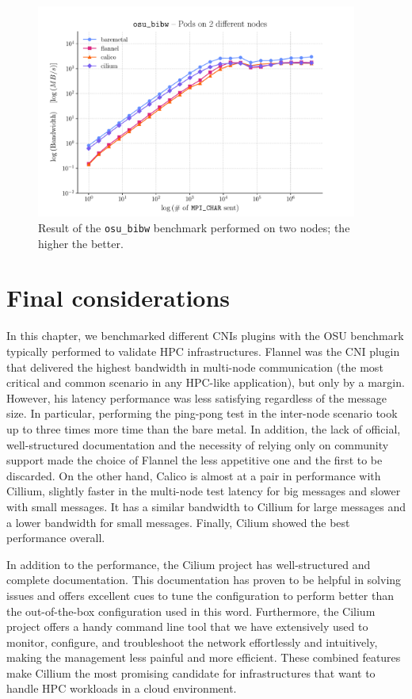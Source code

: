\begin{figure}[H]
  \centering
  \includegraphics[width=0.94\textwidth]{img/chpt3/bibw-2-nodes}
  \caption{Result of the \texttt{osu\_bibw} benchmark performed on two nodes; the
    higher the better.}
  \label{fig:bibw-2-nodes}
\end{figure}

\section{Final considerations}\label{sec:final-considerations}

In this chapter, we benchmarked different CNIs plugins with the OSU benchmark
typically performed to validate HPC infrastructures.
Flannel was the CNI plugin that delivered the highest bandwidth in multi-node
communication (the most critical and common scenario in any HPC-like
application), but only by a margin.
However, his latency performance was less satisfying regardless of the message
size.
In particular, performing the ping-pong test in the inter-node scenario took up
to three times more time than the bare metal.
In addition, the lack of official, well-structured documentation and the
necessity of relying only on community support made the choice of Flannel the
less appetitive one and the first to be discarded.
On the other hand, Calico is almost at a pair in performance with Cillium,
slightly faster in the multi-node test latency for big messages and slower with
small messages.
It has a similar bandwidth to Cillium for large messages and a lower bandwidth
for small messages.
Finally, Cilium showed the best performance overall.

In addition to the performance, the Cilium project has well-structured and
complete documentation. This documentation has proven to be helpful in solving
issues and offers excellent cues to tune the configuration to perform better
than the out-of-the-box configuration used in this word. Furthermore, the Cilium
project offers a handy command line tool that we have extensively used to
monitor, configure, and troubleshoot the network effortlessly and intuitively,
making the management less painful and more efficient. These combined features
make Cillium the most promising candidate for infrastructures that want to
handle HPC workloads in a cloud environment.


